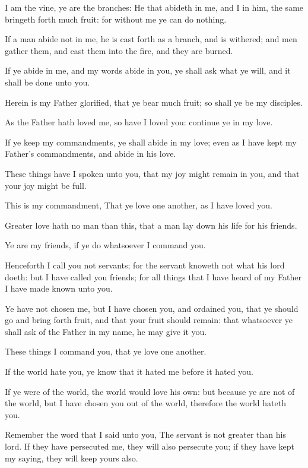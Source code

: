 \Verse I am the vine, ye are the branches: He that abideth in me, and I in him, the same bringeth forth much fruit: for without me ye can do nothing.

\Verse If a man abide not in me, he is cast forth as a branch, and is withered; and men gather them, and cast them into the fire, and they are burned.

\Verse If ye abide in me, and my words abide in you, ye shall ask what ye will, and it shall be done unto you.

\Verse Herein is my Father glorified, that ye bear much fruit; so shall ye be my disciples.

\Verse As the Father hath loved me, so have I loved you: continue ye in my love.

\Verse If ye keep my commandments, ye shall abide in my love; even as I have kept my Father's commandments, and abide in his love.

\Verse These things have I spoken unto you, that my joy might remain in you, and that your joy might be full.

\Verse This is my commandment, That ye love one another, as I have loved you.

\Verse Greater love hath no man than this, that a man lay down his life for his friends.

\Verse Ye are my friends, if ye do whatsoever I command you.

\Verse Henceforth I call you not servants; for the servant knoweth not what his lord doeth: but I have called you friends; for all things that I have heard of my Father I have made known unto you.

\Verse Ye have not chosen me, but I have chosen you, and ordained you, that ye should go and bring forth fruit, and that your fruit should remain: that whatsoever ye shall ask of the Father in my name, he may give it you.

\Verse These things I command you, that ye love one another.

\Verse If the world hate you, ye know that it hated me before it hated you.

\Verse If ye were of the world, the world would love his own: but because ye are not of the world, but I have chosen you out of the world, therefore the world hateth you.

\Verse Remember the word that I said unto you, The servant is not greater than his lord. If they have persecuted me, they will also persecute you; if they have kept my saying, they will keep yours also.

